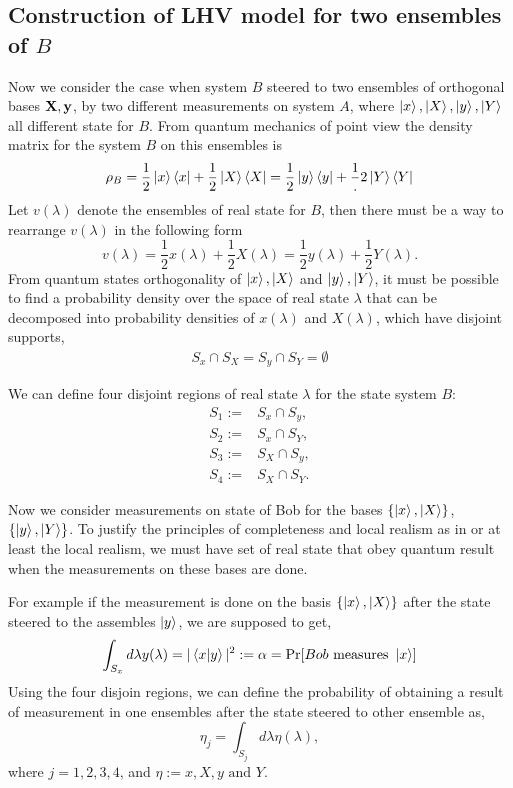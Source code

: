 \subsection{ Construction of LHV model for two ensembles of $B$}\label{Triv}\hfill \break
Now we consider the case when system $B$ steered to two ensembles of orthogonal bases $\bf{X},\bf{y}$, by two different measurements on system $A$, where $\ket{x},\ket{X},\ket{y},\ket{Y}$ all different state for $B$.  From quantum mechanics of point view the density matrix for  the system $B$ on this ensembles is
\begin{equation}\label{STTS}
\rho_B=\frac{1}{2}\ket{x}\bra{x}+\frac{1}{2}\ket{X}\bra{X}=\frac{1}{2}\ket{y}\bra{y}+\frac{1}.{2}\ket{Y}\bra{Y}
\end{equation}
Let $v(\lambda)$ denote the ensembles of real state for $B$, then there must be a way to rearrange $v(\lambda)$ in the following form
\begin{equation}\label{Hidden}
v(\lambda)=\frac{1}{2}x(\lambda)+\frac{1}{2}X(\lambda)=\frac{1}{2}y(\lambda)+\frac{1}{2}Y(\lambda).
\end{equation}
From quantum states orthogonality of $\ket{x}, \ket{X}$ and  $\ket{y} ,\ket{Y}$, it must be possible to find a probability density over the space of real state $\lambda$ that can be decomposed into probability densities of $x(\lambda)$ and $X(\lambda)$, which have disjoint supports,
\begin{align*}
S_x\cap S_X=S_y\cap S_Y=\emptyset
\end{align*}

We can define four disjoint regions of real state $\lambda$ for the state system $B$:
\begin{align*}
S_1:=&S_x\cap S_y,\\
S_2:=&S_x\cap S_Y,\\
S_3:=&S_X\cap S_y,\\
S_4:=&S_X\cap S_Y.
\end{align*}


Now we consider measurements on state of Bob for the bases $\{\ket{x},\ket{X}\}$,$\{\ket{y},\ket{Y}\}$. To justify the principles of completeness and local realism as in  \citep{EPR} or at least the local realism, we must have set of real state that obey quantum result when the measurements on these bases are done.

For example if the measurement is done on the basis $\{\ket{x},\ket{X}\}$ after the state steered to the assembles $\ket{y}$, we are supposed to get,
\begin{equation}
\int_{S_x} d\lambda y(\lambda)=|\bra{x}\ket{y}|^2:=\alpha=\Pr[ Bob \text{ measures } \ket{x}]
\end{equation}
 Using  the four disjoin regions, we can define the probability of obtaining a result of measurement in one ensembles after the state steered to other ensemble as,
\begin{equation}
\eta_j=\int_{S_j} d\lambda \eta(\lambda),
\end{equation}
where $j=1,2,3,4$, and $\eta:= x,X,y \text{ and } Y$.

